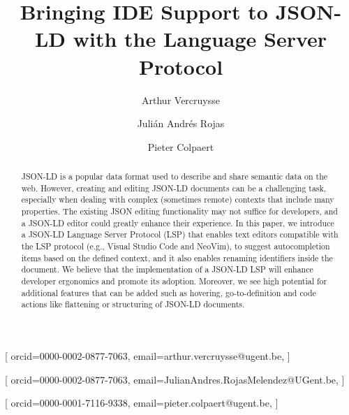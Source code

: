 \documentclass[
]{ceurart}
\begin{document}



\title{Bringing IDE Support to JSON-LD with the Language Server Protocol}


\author[1]{Arthur Vercruysse}[%
orcid=0000-0002-0877-7063,
email=arthur.vercruysse@ugent.be,
]
\author[1]{Julián Andrés Rojas}[%
orcid=0000-0002-0877-7063,
email=JulianAndres.RojasMelendez@UGent.be,
]
\author[1]{Pieter Colpaert}[%
orcid=0000-0001-7116-9338,
email=pieter.colpaert@ugent.be,
]
\cormark[1]
\fnmark[1]
\address[1]{IDLab, Department of Electronics and Information Systems, Ghent University – imec}


\begin{abstract}
  JSON-LD is a popular data format used to describe and share semantic data on the web.
  However, creating and editing JSON-LD documents can be a challenging task, especially when dealing with complex (sometimes remote) contexts that include many properties.
  The existing JSON editing functionality may not suffice for developers, and a JSON-LD editor could greatly enhance their experience.
  In this paper, we introduce a JSON-LD Language Server Protocol (LSP) that enables text editors compatible with the LSP protocol (e.g., Visual Studio Code and NeoVim), to suggest autocompletion items based on the defined context, and it also enables renaming identifiers inside the document.
  We believe that the implementation of a JSON-LD LSP will enhance developer ergonomics and promote its adoption.
  Moreover, we see high potential for additional features that can be added such as hovering, go-to-definition and code actions like flattening or structuring of JSON-LD documents.
\end{abstract}
\end{document}
